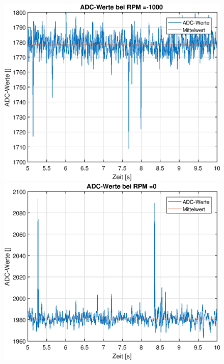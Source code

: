 \begin{figure}[h]
	\includegraphics[width=0.5\linewidth]{img/adc_values_rpm_-1000.eps}
	\includegraphics[width=0.5\linewidth]{img/adc_values_rpm_0.eps}
\end{figure}

